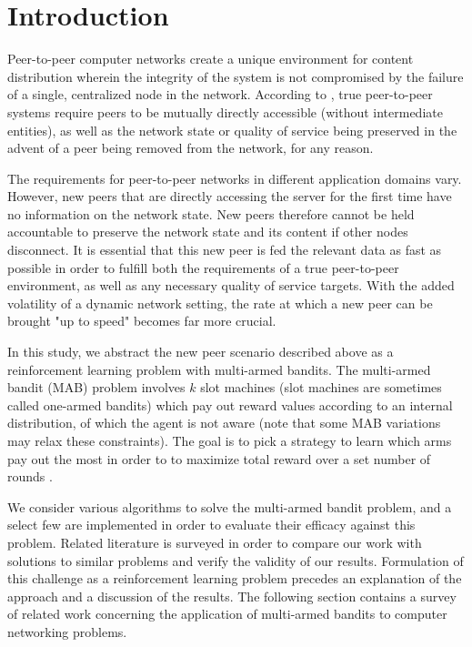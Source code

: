 \documentclass{article}
\begin{document}
\section{Introduction}
Peer-to-peer computer networks create a unique environment for content distribution wherein the integrity of the system is not compromised by the failure of 
a single, centralized node in the network. According to \cite{p2p_def}, true peer-to-peer systems require peers to be mutually directly accessible (without 
intermediate entities), as well as the network state or quality of service being preserved in the advent of a peer being removed from the network, for any 
reason.

The requirements for peer-to-peer networks in different application domains vary. However, new peers that are directly accessing the server for the first time 
have no information on the network state. New peers therefore cannot be held accountable to preserve the network state and its content if other nodes disconnect. 
It is essential that this new peer is fed the relevant data as fast as possible in order to fulfill both the requirements of a true peer-to-peer environment, as 
well as any necessary quality of service targets. With the added volatility of a dynamic network setting, the rate at which a new peer can be brought "up to speed" 
becomes far more crucial.

In this study, we abstract the new peer scenario described above as a reinforcement learning problem with multi-armed bandits. The multi-armed bandit (MAB) problem 
involves $k$ slot machines (slot machines are sometimes called one-armed bandits) which pay out reward values according to an internal distribution, of which the agent 
is not aware (note that some MAB variations may relax these constraints). The goal is to pick a strategy to learn which arms pay out the most in order to to maximize 
total reward over a set number of rounds \cite{mab_algos}. 

We consider various algorithms to solve the multi-armed bandit problem, and a select few are implemented in order to evaluate their efficacy against this problem. 
Related literature is surveyed in order to compare our work with solutions to similar problems and verify the validity of our results. Formulation of this challenge 
as a reinforcement learning problem precedes an explanation of the approach and a discussion of the results. The following section contains a survey of related work 
concerning the application of multi-armed bandits to computer networking problems.
\end{document}
